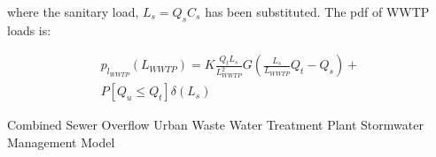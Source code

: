 \documentclass[draft,linenumbers]{agujournal2018}
\begin{document}
where the sanitary load, $L_s = Q_s  C_s$ has been substituted. The pdf of WWTP loads is:
\begin{linenomath*}
\begin{eqnarray}
p_{l_{WWTP}} \left(L_{WWTP} \right) = K  \frac{Q_t L_s}{L_{WWTP}^2}    G\left(\frac{L_s}{L_{WWTP}}  Q_t - Q_s \right)  + \\
P\left[Q_u \le Q_t \right]\delta\left(L_s\right)
\label{eq:a12}
\end{eqnarray}
\end{linenomath*} 


%
%

%
   \begin{acronyms}
    Combined Sewer Overf\/low
    Urban Waste Water Treatment Plant
    Stormwater Management Model
   \end{acronyms}

%




%
%
%
%
%
%
%
%
\end{document}
